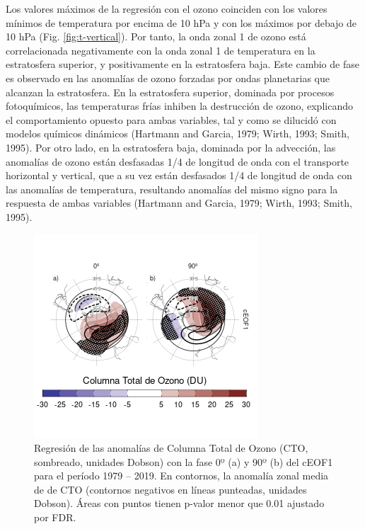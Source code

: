 \documentclass[12pt,oneside]{reedthesis}
\begin{document}
Los valores máximos de la regresión con el ozono coinciden con los valores mínimos de temperatura por encima de 10 hPa y con los máximos por debajo de 10 hPa (Fig. \ref{fig:t-vertical}).
Por tanto, la onda zonal 1 de ozono está correlacionada negativamente con la onda zonal 1 de temperatura en la estratosfera superior, y positivamente en la estratosfera baja.
Este cambio de fase es observado en las anomalías de ozono forzadas por ondas planetarias que alcanzan la estratosfera.
En la estratosfera superior, dominada por procesos fotoquímicos, las temperaturas frías inhiben la destrucción de ozono, explicando el comportamiento opuesto para ambas variables, tal y como se dilucidó con modelos químicos dinámicos (Hartmann and Garcia, 1979; Wirth, 1993; Smith, 1995).
Por otro lado, en la estratosfera baja, dominada por la advección, las anomalías de ozono están desfasadas 1/4 de longitud de onda con el transporte horizontal y vertical, que a su vez están desfasados 1/4 de longitud de onda con las anomalías de temperatura, resultando anomalías del mismo signo para la respuesta de ambas variables (Hartmann and Garcia, 1979; Wirth, 1993; Smith, 1995).





\begin{figure}
\includegraphics{figures/20-ceofs/o3-regr-1} \caption{Regresión de las anomalías de Columna Total de Ozono (CTO, sombreado, unidades Dobson) con la fase 0º (a) y 90º (b) del cEOF1 para el período 1979 -- 2019.
En contornos, la anomalía zonal media de de CTO (contornos negativos en líneas punteadas, unidades Dobson).
Áreas con puntos tienen p-valor menor que 0.01 ajustado por FDR.}\label{fig:o3-regr}
\end{figure}
\end{document}
